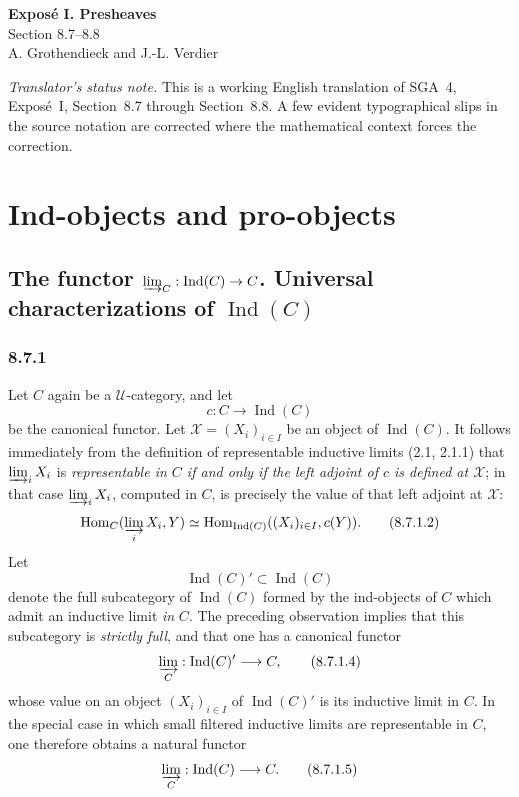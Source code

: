 \documentclass[11pt]{article}
\newcommand{\U}{\mathcal{U}}
\newcommand{\Hom}{\operatorname{Hom}}
\newcommand{\Ind}{\operatorname{Ind}}
\begin{document}
\begin{center}
{\Large \textbf{Expos\'e I. Presheaves}}\\[0.35em]
{\large Section 8.7--8.8}\\[0.35em]
A. Grothendieck and J.-L. Verdier
\end{center}

\bigskip

\noindent\emph{Translator's status note.} This is a working English translation of SGA~4, Expos\'e~I, Section~8.7 through Section~8.8. A few evident typographical slips in the source notation are corrected where the mathematical context forces the correction.

\setcounter{section}{7}
\section{Ind-objects and pro-objects}

\setcounter{subsection}{6}
\subsection{The functor \texorpdfstring{$\varinjlim_C:\Ind(C)\to C$}{colim\_C: Ind(C) -> C}. Universal characterizations of \texorpdfstring{$\Ind(C)$}{Ind(C)}}

\subsubsection*{8.7.1}
Let $C$ again be a $\U$-category, and let
\[
 c:C\longrightarrow \Ind(C)
\tag{8.7.1.1}
\]
be the canonical functor. Let $\mathcal X=(X_i)_{i\in I}$ be an object of $\Ind(C)$. It follows immediately from the definition of representable inductive limits (2.1, 2.1.1) that $\varinjlim_i X_i$ is \emph{representable in $C$ if and only if the left adjoint of $c$ is defined at $\mathcal X$}; in that case $\varinjlim_i X_i$, computed in $C$, is precisely the value of that left adjoint at $\mathcal X$:
\[
\Hom_C(\varinjlim_i X_i,Y)\simeq
\Hom_{\Ind(C)}((X_i)_{i\in I},c(Y)).
\tag{8.7.1.2}
\]
Let
\[
\Ind(C)'\subset \Ind(C)
\tag{8.7.1.3}
\]
denote the full subcategory of $\Ind(C)$ formed by the ind-objects of $C$ which admit an inductive limit \emph{in} $C$. The preceding observation implies that this subcategory is \emph{strictly full}, and that one has a canonical functor
\[
\varinjlim_C:\Ind(C)'\longrightarrow C,
\tag{8.7.1.4}
\]
whose value on an object $(X_i)_{i\in I}$ of $\Ind(C)'$ is its inductive limit in $C$. In the special case in which small filtered inductive limits are representable in $C$, one therefore obtains a natural functor
\[
\varinjlim_C:\Ind(C)\longrightarrow C.
\tag{8.7.1.5}
\]
\end{document}
